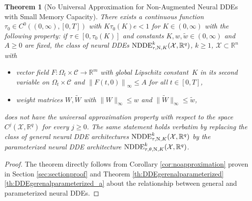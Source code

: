 \documentclass[10pt]{article}
\numberwithin{equation}{section}
\newtheorem{theorem}{Theorem}[section]
\newcommand\norm[1]{\left\lVert#1\right\rVert}
\newcommand\normm[1]{\big\lVert#1\big\lVert}
\begin{document}
	\begin{theorem}[No Universal Approximation for Non-Augmented Neural DDEs with Small Memory Capacity]\label{th:tau0}
		There exists a continuous function $\tau_0\in C^0((0,\infty),[0,T])$ with $K \tau_0(K) e<1$ for $K\in(0,\infty)$ with the following property: if $\tau \in [0,\tau_0(K)]$ and constants $K,w,\tilde w\in (0,\infty)$ and $A\geq 0$ are fixed, the class of neural DDEs $\textup{NDDE}_{\tau,\textup{N},K}^k(\mathcal{X},\mathbb{R}^q)$, $k \geq 1$, $\mathcal{X}\subset \mathbb{R}^n$ with
		\begin{itemize}
			\item  vector field $F:\Omega_t \times \mathcal{C} \rightarrow \mathbb{R}^m$ with global Lipschitz constant~$K$ in its second variable on $\Omega_t \times \mathcal{C}$ and $\norm{F(t,0)}_\infty \leq A$ for all $t\in [0,T]$,
			\item weight matrices $W, \widetilde{W}$ with $\normm{W}_\infty \leq w$ and $\normm{\widetilde{W}}_\infty \leq\tilde{w}$,
		\end{itemize}
		does not have the universal approximation property with respect to the space  $C^j(\mathcal{X},\mathbb{R}^q)$ for every $j\geq 0$. 	The same statement holds verbatim by replacing the class of general neural DDE architectures $\textup{NDDE}_{\tau,\textup{N},K}^k(\mathcal{X},\mathbb{R}^q)$ by the parameterized neural DDE architecture $ \textup{NDDE}_{\tau,\theta,\textup{N},K}^k(\mathcal{X},\mathbb{R}^q)$. 
	\end{theorem}
	
	
	\begin{proof}
		The theorem directly follows from Corollary \ref{cor:noapproximation} proven in Section \ref{sec:sectionproof} and Theorem \ref{th:DDEgerenalparameterized}\ref{th:DDEgerenalparameterized_a} about the relationship between general and parameterized neural DDEs.
	\end{proof}
	
\end{document}
